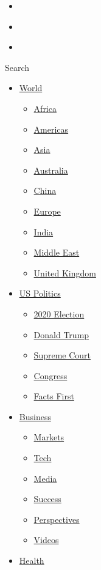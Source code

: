 \begin{itemize}
\item
\end{itemize}

\begin{itemize}
\item
\end{itemize}

\begin{itemize}
\item
\end{itemize}

Search

\begin{itemize}
\tightlist
\item
  \href{/world}{World}

  \begin{itemize}
  \tightlist
  \item
    \href{/africa}{Africa}
  \item
    \href{/americas}{Americas}
  \item
    \href{/asia}{Asia}
  \item
    \href{/australia}{Australia}
  \item
    \href{/china}{China}
  \item
    \href{/europe}{Europe}
  \item
    \href{/india}{India}
  \item
    \href{/middle-east}{Middle East}
  \item
    \href{/uk}{United Kingdom}
  \end{itemize}
\item
  \href{/politics}{US Politics}

  \begin{itemize}
  \tightlist
  \item
    \href{/election/2020}{2020 Election}
  \item
    \href{/specials/politics/president-donald-trump-45}{Donald Trump}
  \item
    \href{/specials/politics/supreme-court-nine}{Supreme Court}
  \item
    \href{/specials/politics/congress}{Congress}
  \item
    \href{/specials/politics/fact-check-politics}{Facts First}
  \end{itemize}
\item
  \href{/business}{Business}

  \begin{itemize}
  \tightlist
  \item
    \href{https://money.cnn.com/data/markets/}{Markets}
  \item
    \href{/business/tech}{Tech}
  \item
    \href{/business/media}{Media}
  \item
    \href{/business/success}{Success}
  \item
    \href{/business/perspectives}{Perspectives}
  \item
    \href{/business/videos}{Videos}
  \end{itemize}
\item
  \href{/health}{Health}


\end{itemize}

